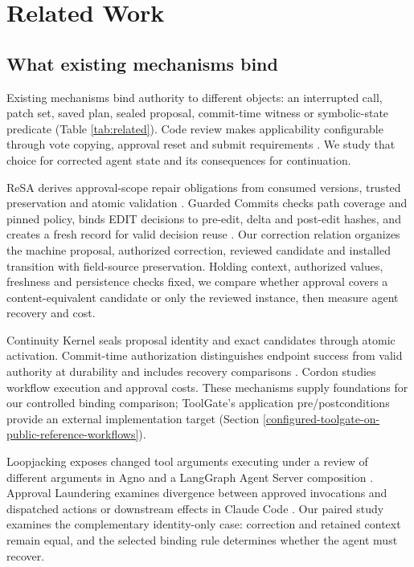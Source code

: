 \section{Related Work}\label{related-work}

\subsection{What existing mechanisms bind}\label{existing-binding-and-enforcement-mechanisms}

Existing mechanisms bind authority to different objects: an interrupted call, patch set, saved plan, sealed proposal, commit-time witness or symbolic-state predicate (Table \ref{tab:related}). Code review makes applicability configurable through vote copying, approval reset and submit requirements \citep{gerrit-copy-condition,gitlab-approvals}. We study that choice for corrected agent state and its consequences for continuation.



ReSA derives approval-scope repair obligations from consumed versions, trusted preservation and atomic validation \citep{zhu2026resa}. Guarded Commits checks path coverage and pinned policy, binds EDIT decisions to pre-edit, delta and post-edit hashes, and creates a fresh record for valid decision reuse \citep{bindschaedler2026guarded}. Our correction relation organizes the machine proposal, authorized correction, reviewed candidate and installed transition with field-source preservation. Holding context, authorized values, freshness and persistence checks fixed, we compare whether approval covers a content-equivalent candidate or only the reviewed instance, then measure agent recovery and cost.

Continuity Kernel seals proposal identity and exact candidates through atomic activation. Commit-time authorization distinguishes endpoint success from valid authority at durability and includes recovery comparisons \citep{commit-time-auth}. Cordon studies workflow execution and approval costs. These mechanisms supply foundations for our controlled binding comparison; ToolGate's application pre/postconditions provide an external implementation target (Section \ref{configured-toolgate-on-public-reference-workflows}).

Loopjacking exposes changed tool arguments executing under a review of different arguments in Agno and a LangGraph Agent Server composition \citep{kumar2026loopjacking}. Approval Laundering examines divergence between approved invocations and dispatched actions or downstream effects in Claude Code \citep{wang2026approval}. Our paired study examines the complementary identity-only case: correction and retained context remain equal, and the selected binding rule determines whether the agent must recover.

